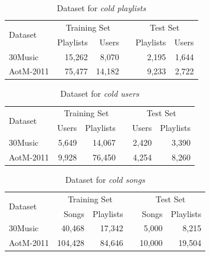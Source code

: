 \begin{table}[!h]
    \centering
    \caption{Dataset for \emph{cold playlists}}
    \label{tab:stats3}
    \begin{tabular}{lrrcrr}
        \toprule
        \multirow{2}{*}{Dataset}  & \multicolumn{2}{c}{Training Set} && \multicolumn{2}{c}{Test Set} \\ \cmidrule{2-3} \cmidrule{5-6}
                                  & Playlists & Users && Playlists & Users \\
        \midrule
        30Music   & 15,262 &  8,070 && 2,195  & 1,644 \\
        AotM-2011 & 75,477 & 14,182 && 9,233  & 2,722 \\
        \bottomrule
    \end{tabular}
\end{table}

\begin{table}[!h]
    \centering
    \caption{Dataset for \emph{cold users}}
    \label{tab:stats4}
    \begin{tabular}{lrrcrr}
        \toprule
        \multirow{2}{*}{Dataset}  & \multicolumn{2}{c}{Training Set} && \multicolumn{2}{c}{Test Set} \\ \cmidrule{2-3} \cmidrule{5-6}
                                  & Users & Playlists && Users & Playlists \\
        \midrule
        30Music   & 5,649 & 14,067 && 2,420 & 3,390 \\
        AotM-2011 & 9,928 & 76,450 && 4,254 & 8,260 \\
        \bottomrule
    \end{tabular}
\end{table}

\begin{table}[!h]
    \centering
    \caption{Dataset for \emph{cold songs}}
    \label{tab:stats1}
    \begin{tabular}{lrrcrr}
        \toprule
        \multirow{2}{*}{Dataset}  & \multicolumn{2}{c}{Training Set} && \multicolumn{2}{c}{Test Set} \\ \cmidrule{2-3} \cmidrule{5-6}
                                  & Songs & Playlists && Songs & Playlists \\
        \midrule
        30Music   & 40,468  & 17,342 && 5,000  & 8,215 \\
        AotM-2011 & 104,428 & 84,646 && 10,000 & 19,504 \\
        \bottomrule
    \end{tabular}
\end{table}


